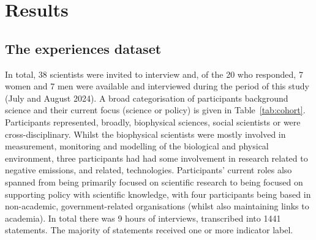 \chapter{Results}\label{ch:results}

\section{The experiences dataset}\label{sec:resdataset}
In total, 38 scientists were invited to interview and, of the 20 who responded, 7 women and 7 men were available and interviewed during the period of this study (July and August 2024). A broad categorisation of participants background science and their current focus (science or policy) is given in Table~\ref{tab:cohort}. Participants represented, broadly, biophysical sciences, social scientists or were cross-disciplinary. Whilst the biophysical scientists were mostly involved in measurement, monitoring and modelling of the biological and physical environment, three participants had had some involvement in research related to negative emissions, and related, technologies. Participants' current roles also spanned from being primarily focused on scientific research to being focused on supporting policy with scientific knowledge, with four participants being based in non-academic, government-related organisations (whilst also maintaining links to academia). In total there was 9\textonehalf{} hours of interviews, transcribed into 1441 statements. The majority of statements received one or more indicator label.



